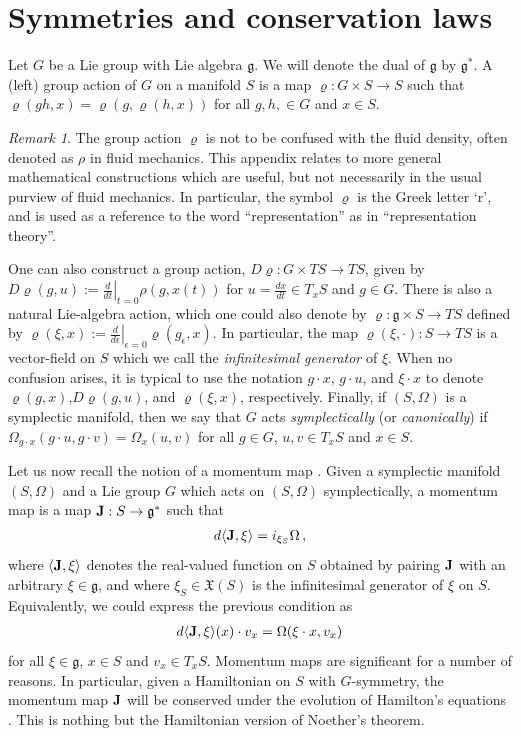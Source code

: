 \documentclass[12pt]{amsart}
\theoremstyle{remark}
\newtheorem{rmk}[thm]{Remark}
\begin{document}
\section{Symmetries and conservation laws}
\label{sec:symmetries}
Let $G$ be a Lie group with Lie algebra $\mathfrak{g}$.
We will denote the dual of $\mathfrak{g}$ by $\mathfrak{g}^*$.
A (left) group action of $G$ on a manifold $S$ is a map $\varrho: G \times S \to S$
such that $\varrho( g h , x) = \varrho(g , \varrho(h , x))$ for all $g,h, \in G$ and $x \in S$.
\begin{rmk}
The group action $\varrho$ is not to be confused with the fluid density, often denoted as $\rho$ in fluid mechanics.
This appendix relates to more general mathematical constructions which are useful, but not necessarily in the usual purview of fluid mechanics.
In particular, the symbol $\varrho$ is the Greek letter `r', and is used as a reference to the word ``representation''
as in ``representation theory''.
\end{rmk}
One can also construct a group action, $D\varrho: G \times TS \to TS$,  given by
$D\varrho( g , u ) := \left.\frac{d}{dt}\right|_{t=0} \rho(g, x(t) )$ for $u = \frac{dx}{dt} \in T_x S$ and $g \in G$.
There is also a natural Lie-algebra action, which one could also denote by $\varrho: \mathfrak{g} \times S \to TS$
defined by $\varrho( \xi , x) := \left. \frac{d}{d \epsilon} \right|_{\epsilon =0} \varrho( g_\epsilon , x)$.
In particular, the map $\varrho( \xi , \cdot ) : S \to TS$ is a vector-field on $S$ which we call the
\emph{infinitesimal generator} of $\xi$.
When no confusion arises, it is typical to use the notation $g \cdot x$, $g \cdot u$, and $\xi \cdot x$ to denote $\varrho(g,x)$,$D\varrho(g,u)$,  and $\varrho(\xi,x)$, respectively.
Finally, if $(S,\Omega)$ is a symplectic manifold, then we say that $G$ acts \emph{symplectically} (or \emph{canonically})
if $\Omega_{g \cdot x}( g \cdot u , g \cdot v) = \Omega_x(u,v)$ for all $g \in G$, $u,v \in T_x S$ and $x \in S$.

Let us now recall the notion of a momentum map \cite[Definition 4.2.1]{FOM}.
Given a symplectic manifold $(S,\Omega)$ and a Lie group $G$ which acts on $(S,\Omega)$ symplectically, a momentum map is a map ${\bf J}:S \to \mathfrak{g}^*$ such that
\begin{align*}
  d \langle {\bf J} , \xi \rangle = i_{\xi_S} \Omega\,,
\end{align*}
where $\langle {\bf J} , \xi \rangle$ denotes the real-valued function on $S$ obtained by pairing ${\bf J}$ with an arbitrary
 $\xi \in \mathfrak{g}$, and where $\xi_S \in \mathfrak{X}(S)$ is the infinitesimal generator of $\xi$ on $S$.
Equivalently, we could express the previous condition as
\begin{align}
  d \langle {\bf J},\xi \rangle(x) \cdot v_x = \Omega( \xi\cdot x , v_x ) \label{eq:momap}
\end{align}
for all $\xi \in \mathfrak{g}$, $x \in S$ and $v_x \in T_xS$.
Momentum maps are significant for a number of reasons.
In particular, given a Hamiltonian on $S$ with $G$-symmetry, the momentum map ${\bf J}$ will be conserved under the evolution of
Hamilton's equations \cite[Theorem 4.2.2]{FOM}.
This is nothing but the Hamiltonian version of Noether's theorem.
\end{document}
